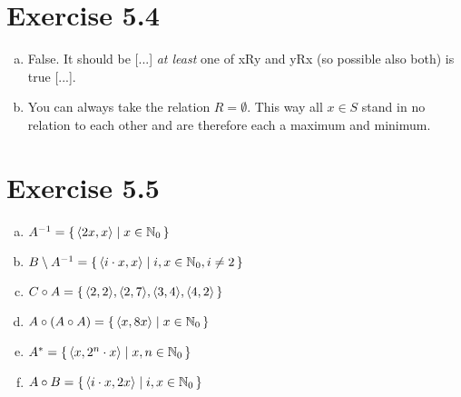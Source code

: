 \documentclass{article} %
\newcommand{\homeworkNumber}{5}
\begin{document}
\section*{Exercise \homeworkNumber.4}

\begin{enumerate}[a)]
\item False. It should be [...] \emph{at least} one of xRy and yRx (so possible also both) is true [...].
\item You can always take the relation $R = \emptyset$. This way all $x \in S$ stand in no relation to each other and are therefore each a maximum and minimum.
\end{enumerate}

\section*{Exercise \homeworkNumber.5}

\begin{enumerate}[a)]

\item $A^{-1} = \set{\langle 2x, x \rangle \mid x \in \mathbb{N}_0}$

\item $B \setminus A^{-1} = \set{\langle i \cdot x, x \rangle \mid i,x \in \mathbb{N}_0, i \neq 2}$

\item $C \circ A = \set{\langle 2,2 \rangle, \langle 2,7 \rangle, \langle 3,4 \rangle , \langle 4,2 \rangle}$

\item $A \circ (A \circ A) = \set{\langle x, 8x \rangle \mid x \in \mathbb{N}_0}$

\item $A^* = \set{\langle x, 2^{n} \cdot x \rangle \mid x,n \in \mathbb{N}_0}$

\item $A \circ B = \set{\langle i \cdot x, 2x \rangle \mid i,x \in \mathbb{N}_0}$

\end{enumerate}
\end{document}
